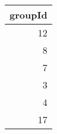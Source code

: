 \begin{tabular}{r}
\toprule
groupId \\
\midrule
12 \\
8 \\
7 \\
3 \\
4 \\
17 \\
\bottomrule
\end{tabular}
